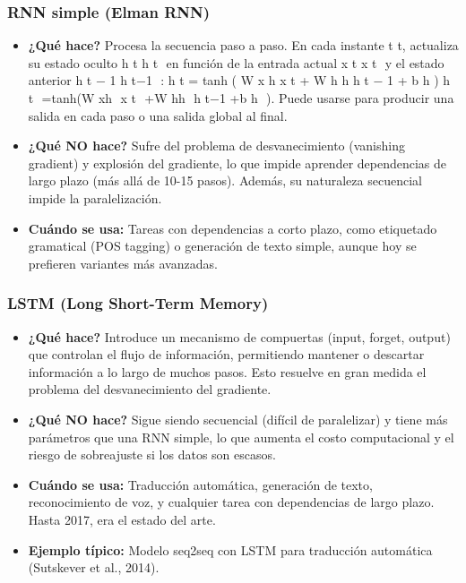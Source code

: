 \documentclass[12pt,a4paper,openany,oneside]{book}
\begin{document}
\subsubsection{RNN simple (Elman RNN)}
\begin{itemize}
\item \textbf{¿Qué hace?} Procesa la secuencia paso a paso. En cada instante 
t
t, actualiza su estado oculto 
h
t
h 
t
​
  en función de la entrada actual 
x
t
x 
t
​
  y el estado anterior 
h
t
−
1
h 
t−1
​
 : 
h
t
=
tanh
⁡
(
W
x
h
x
t
+
W
h
h
h
t
−
1
+
b
h
)
h 
t
​
 =tanh(W 
xh
​
 x 
t
​
 +W 
hh
​
 h 
t−1
​
 +b 
h
​
 ). Puede usarse para producir una salida en cada paso o una salida global al final.
\item \textbf{¿Qué NO hace?} Sufre del problema de desvanecimiento (vanishing gradient) y explosión del gradiente, lo que impide aprender dependencias de largo plazo (más allá de 10-15 pasos). Además, su naturaleza secuencial impide la paralelización.
\item \textbf{Cuándo se usa:} Tareas con dependencias a corto plazo, como etiquetado gramatical (POS tagging) o generación de texto simple, aunque hoy se prefieren variantes más avanzadas.
\end{itemize}

\subsubsection{LSTM (Long Short-Term Memory)}
\begin{itemize}
\item \textbf{¿Qué hace?} Introduce un mecanismo de compuertas (input, forget, output) que controlan el flujo de información, permitiendo mantener o descartar información a lo largo de muchos pasos. Esto resuelve en gran medida el problema del desvanecimiento del gradiente.
\item \textbf{¿Qué NO hace?} Sigue siendo secuencial (difícil de paralelizar) y tiene más parámetros que una RNN simple, lo que aumenta el costo computacional y el riesgo de sobreajuste si los datos son escasos.
\item \textbf{Cuándo se usa:} Traducción automática, generación de texto, reconocimiento de voz, y cualquier tarea con dependencias de largo plazo. Hasta 2017, era el estado del arte.
\item \textbf{Ejemplo típico:} Modelo seq2seq con LSTM para traducción automática (Sutskever et al., 2014).
\end{itemize}
\end{document}
